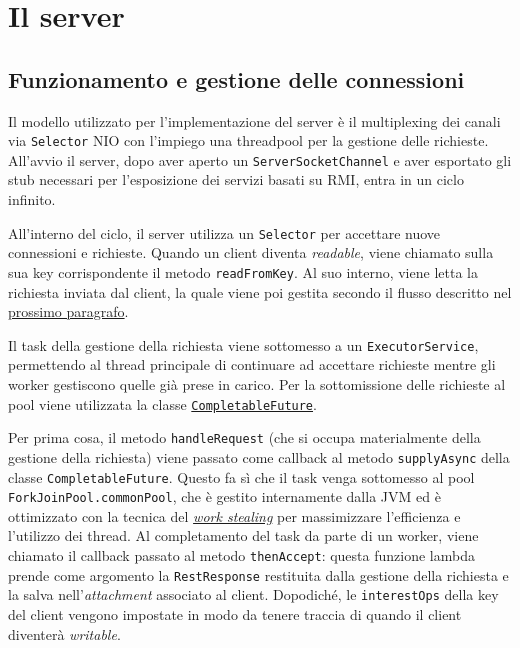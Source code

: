 \documentclass[a4paper,8pt]{article} %
\def\code#1{\texttt{#1}}
\begin{document}
\section{Il server}

\subsection{Funzionamento e gestione delle connessioni}
Il modello utilizzato per l'implementazione del server è il multiplexing dei canali via \code{Selector} NIO con l'impiego una threadpool per la gestione delle richieste.
All'avvio il server, dopo aver aperto un \code{ServerSocketChannel} e aver esportato gli stub necessari per l'esposizione dei servizi basati su RMI,
entra in un ciclo infinito.
\par All'interno del ciclo, il server utilizza un \code{Selector} per accettare nuove connessioni e richieste.
Quando un client diventa \emph{readable}, viene chiamato sulla sua key corrispondente il metodo \code{readFromKey}. Al suo interno, viene letta la richiesta inviata dal client,
la quale viene poi gestita secondo il flusso descritto nel \hyperref[sec:http_flow]{prossimo paragrafo}.

\par Il task della gestione della richiesta viene sottomesso a un \code{ExecutorService}, permettendo al thread principale di continuare ad accettare richieste mentre gli worker gestiscono quelle già prese in carico.
Per la sottomissione delle richieste al pool viene utilizzata la classe \href{https://docs.oracle.com/javase/8/docs/api/java/util/concurrent/CompletableFuture.html}{\code{CompletableFuture}}.
\par Per prima cosa, il metodo \code{handleRequest} (che si occupa materialmente della gestione della richiesta) viene passato come callback al metodo \code{supplyAsync} della classe \code{CompletableFuture}.
Questo fa sì che il task venga sottomesso al pool \code{ForkJoinPool.commonPool}, che è gestito internamente dalla JVM ed è ottimizzato con la tecnica del \href{https://en.wikipedia.org/wiki/Work_stealing}{\emph{work stealing}} per massimizzare l'efficienza e l'utilizzo dei thread.
Al completamento del task da parte di un worker, viene chiamato il callback passato al metodo \code{thenAccept}: questa funzione lambda prende come argomento la \code{RestResponse} restituita dalla gestione della richiesta e la salva nell'\emph{attachment} associato al client.
Dopodiché, le \code{interestOps} della key del client vengono impostate in modo da tenere traccia di quando il client diventerà \emph{writable}.
\end{document}
